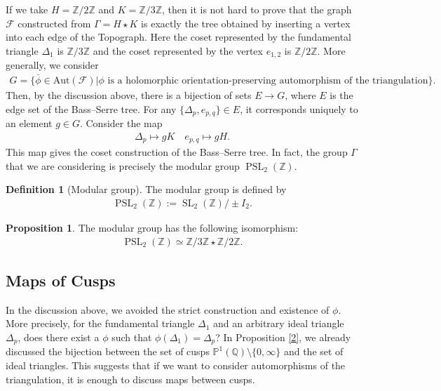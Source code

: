 \documentclass[10pt, a4paper]{article}
\renewcommand{\P}{\mathbb{P}}
\newcommand{\Z}{\mathbb{Z}}
\newcommand{\Q}{\mathbb{Q}}
\newcommand{\SL}{\operatorname{SL}_2(\Z)}
\newcommand{\PSL}{\operatorname{PSL}_2(\Z)}
\theoremstyle{definition}
\newtheorem{proposition}[theorem]{Proposition}
\newtheorem{definition}[theorem]{Definition}
\theoremstyle{remark}
\begin{document}
If we take \(H=\mathbb{Z}/2\mathbb{Z}\) and \(K=\mathbb{Z}/3\mathbb{Z}\), then it is not hard to prove that the graph \(\mathcal{F}\) constructed from \(\Gamma= H \star K \) is exactly the tree obtained by inserting a vertex into each edge of the Topograph.
Here the coset represented by the fundamental triangle \(\Delta_1\) is \(\mathbb{Z}/3\mathbb{Z}\) and the coset represented by the vertex \(e_{1,2}\) is \(\mathbb{Z}/2\mathbb{Z}\).
More generally, we consider
\begin{align*}
    G = \{\bar{\phi}\in \text{Aut}(\mathcal{F})| \phi\text{ is a holomorphic orientation-preserving automorphism of the triangulation}\}.
\end{align*}
Then, by the discussion above, there is a bijection of sets \(E\to G\), where \(E\) is the edge set of the Bass--Serre tree. For any \(\{\Delta_p,e_{p,q}\}\in E\), it corresponds uniquely to an element \(g\in G\). Consider the map
\begin{align*}
    \Delta_p \mapsto g K \quad e_{p,q}\mapsto gH.
\end{align*}
This map gives the coset construction of the Bass--Serre tree. In fact, the group \(\Gamma\) that we are considering is precisely the modular group \(\PSL\).

\begin{definition}[Modular group]
    The modular group is defined by
    \begin{align*}
        \PSL := \SL/\pm I_2.
    \end{align*}
\end{definition}

\begin{proposition}
    The modular group has the following isomorphism:
    \begin{align*}
        \PSL \simeq \mathbb{Z}/3\mathbb{Z}\star \mathbb{Z}/2\mathbb{Z}.
    \end{align*}
\end{proposition}

\subsection{Maps of Cusps}

In the discussion above, we avoided the strict construction and existence of \(\phi\). More precisely, for the fundamental triangle \(\Delta_1\) and an arbitrary ideal triangle \(\Delta_p\), does there exist a \(\phi\) such that \(\phi(\Delta_1) = \Delta_p\)?
In Proposition {\ref{2}}, we already discussed the bijection between the set of cusps \(\P^1(\Q)\setminus\{0,\infty\}\) and the set of ideal triangles. This suggests that if we want to consider automorphisms of the triangulation, it is enough to discuss maps between cusps.
\end{document}
